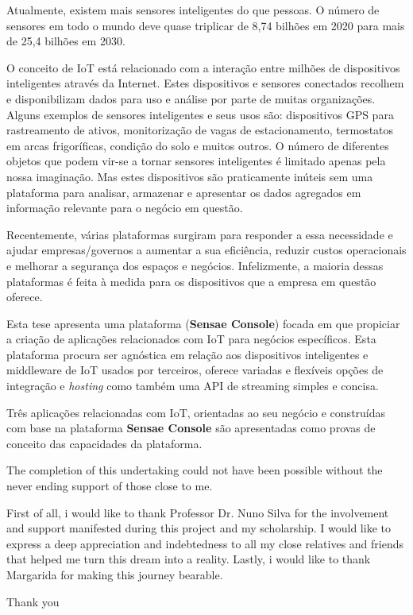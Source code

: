 \begin{abstractotherlanguage}

Atualmente, existem mais sensores inteligentes do que pessoas. O número de sensores em todo o mundo deve quase triplicar de 8,74 bilhões em 2020 para mais de 25,4 bilhões em 2030.

O conceito de \gls{IoT} está relacionado com a interação entre milhões de dispositivos inteligentes através da Internet. Estes dispositivos e sensores conectados recolhem e disponibilizam dados para uso e análise por parte de muitas organizações.
Alguns exemplos de sensores inteligentes e seus usos são: dispositivos GPS para rastreamento de ativos, monitorização de vagas de estacionamento, termostatos em arcas frigoríficas, condição do solo e muitos outros. O número de diferentes objetos que podem vir-se a tornar sensores inteligentes é limitado apenas pela nossa imaginação. Mas estes dispositivos são praticamente inúteis sem uma plataforma para analisar, armazenar e apresentar os dados agregados em informação relevante para o negócio em questão.

Recentemente, várias plataformas surgiram para responder a essa necessidade e ajudar empresas/governos a aumentar a sua eficiência, reduzir custos operacionais e melhorar a segurança dos espaços e negócios. Infelizmente, a maioria dessas plataformas é feita à medida para os dispositivos que a empresa em questão oferece.

Esta tese apresenta uma plataforma (\textbf{Sensae Console}) focada em que propiciar a criação de aplicações relacionados com \gls{IoT} para negócios específicos. Esta plataforma procura ser agnóstica em relação aos dispositivos inteligentes e middleware de \gls{IoT} usados por terceiros, oferece variadas e flexíveis opções de integração e \textit{hosting} como também uma \gls{API} de streaming simples e concisa.

Três aplicações relacionadas com \gls{IoT}, orientadas ao seu negócio e construídas com base na plataforma \textbf{Sensae Console} são apresentadas como provas de conceito das capacidades da plataforma.

\end{abstractotherlanguage}


\begin{acknowledgements}
The completion of this undertaking could not have been possible without the never ending support of those close to me. 

First of all, i would like to thank Professor Dr. Nuno Silva for the involvement and support manifested during this project and my scholarship. 
I would like to express a deep appreciation and indebtedness to all my close relatives and friends that helped me turn this dream into a reality.
Lastly, i would like to thank Margarida for making this journey bearable.

Thank you
\end{acknowledgements}


